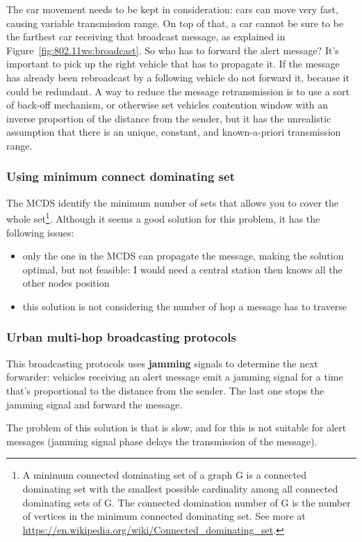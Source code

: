The car movement needs to be kept in consideration: cars can move very fast,
causing variable transmission range. On top of that, a car cannot be sure to
be the farthest car receiving that broadcast message, as explained in
Figure~\ref{fig:802.11ws:broadcast}. So who has to forward the alert message?
It's important to pick up the right vehicle that has to propagate it.
If the message has already been rebroadcast by a following vehicle do not
forward it, because it could be redundant. A way to reduce the message
retransmission is to use a sort of back-off mechanism, or otherwise set vehicles
contention window with an inverse proportion of the distance from the sender,
but it has the unrealistic assumption that there is an unique, constant, and
known-a-priori transmission range.

\subsubsection{Using minimum connect dominating set} The MCDS identify the
minimum number of sets that allows you to cover the whole set\footnote{A minimum
  connected dominating set of a graph G is a connected dominating set with the
  smallest possible cardinality among all connected dominating sets of G. The
  connected domination number of G is the number of vertices in the minimum
  connected dominating set. See more at
  \url{https://en.wikipedia.org/wiki/Connected_dominating_set}.
}.
Although it seems a good solution for this problem, it has the following
issues:
\begin{itemize}
\item only the one in the MCDS can propagate the message, making the solution
  optimal, but not feasible: I would need a central station then knows all the
  other nodes position
\item this solution is not considering the number of hop a message has to
  traverse
\end{itemize}

\subsubsection{Urban multi-hop broadcasting protocols} This broadcasting
protocols uses \textbf{jamming} signals to determine the next forwarder:
vehicles receiving an alert message emit a jamming signal for a time that's
proportional to the distance from the sender. The last one stops the jamming
signal and forward the message.

The problem of this solution is that is slow, and for this is not suitable for
alert messages (jamming signal phase delays the transmission of the message).

